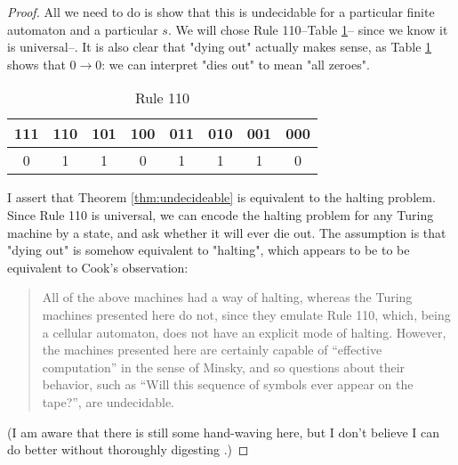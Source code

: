 \documentclass[]{article}
\begin{document}
\begin{proof}
	All we need to do is show that this is undecidable for a particular finite automaton and a particular $s$. We will chose Rule 110--Table \ref{table:rule110}-- since we know it is universal--\cite{cook2004universality}. It is also clear that "dying out" actually makes sense, as Table \ref{table:rule110} shows that $0\rightarrow 0$: we can interpret "dies out" to mean "all zeroes".
	\begin{table}[H]
		\begin{center}
			\caption{Rule 110\cite{wiki:rule:110}}\label{table:rule110}
			\begin{tabular}{|c|c|c|c|c|c|c|c|}\hline
				111 &110&101&100&011&010&001&000\\ \hline
				0 &	1& 	1& 	0&	1 &	1 &	1& 	0 \\ \hline
			\end{tabular}
		\end{center}
	\end{table}
	
	I assert that Theorem \ref{thm:undecideable} is equivalent to the halting problem. Since Rule 110 is universal, we can encode the halting problem for any Turing machine by a state, and ask whether it will ever die out. The assumption is that "dying out" is somehow equivalent to "halting", which appears to be to be equivalent to Cook's observation: \cite[page 38]{cook2004universality}
	\begin{quotation}
		All of the above machines had a way of halting, whereas the Turing machines presented here do not, since they emulate Rule 110, which, being a 	cellular automaton, does not have an explicit mode of halting. However, the machines presented here are certainly capable of “effective computation” in the sense of Minsky, and so questions about their behavior, 	such as “Will this sequence of symbols ever appear on the tape?”, are undecidable.
	\end{quotation}

	(I am aware that there is still some hand-waving here, but I don't believe I can do better without thoroughly digesting \cite{cook2004universality}.)
\end{proof}






\raggedright
{}

\end{document}
